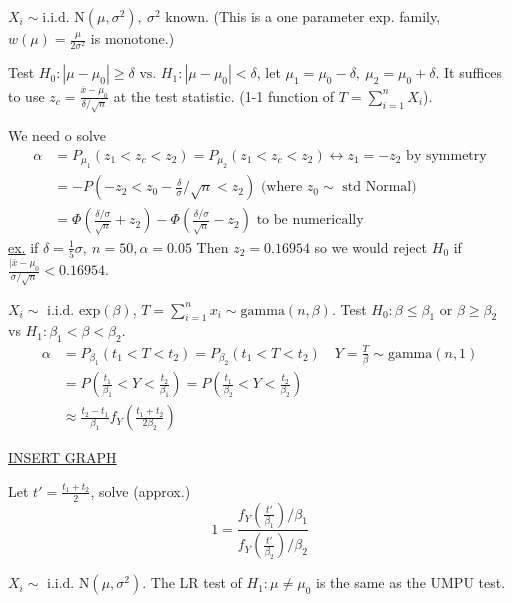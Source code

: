 \documentclass[english, 11pt]{article}
\newcommand{\lp}{\left(}
\newcommand{\rp}{\right)}
\begin{document}
\begin{exmp}
$X_i\sim\text{i.i.d. N}(\mu, \sigma^2), ~\sigma^2$ known. (This is a one parameter exp. family, $w(\mu)=\frac{\mu}{2\sigma^2}$ is monotone.)

Test $H_0:|\mu-\mu_0|\geq\delta\text{ vs. }H_1:|\mu-\mu_0|<\delta$, let $\mu_1=\mu_0-\delta, ~\mu_2=\mu_0+\delta$. It suffices to use $z_c=\frac{\bar{x}-\mu_0}{\delta/\sqrt{n}}$ at the test statistic. (1-1 function of $T=\sum_{i=1}^nX_i$).

We need o solve
$$
\begin{aligned}
\alpha&=P_{\mu_1}(z_1<z_c<z_2)=P_{\mu_2}(z_1<z_c<z_2)\leftrightarrow z_1=-z_2\text{ by symmetry}\\
&=-P\left(-z_2<z_0-\frac{\delta}{\sigma}\big/\sqrt{n}<z_2\right)\text{ (where $z_0\sim$ std Normal)}\\
&=\Phi\left(\frac{\delta/\sigma}{\sqrt{n}}+z_2\right)-\Phi\left(\frac{\delta/\sigma}{\sqrt{n}}-z_2\right)\text{ to be numerically}
\end{aligned}
$$
\underline{ex.} if $\delta=\frac{1}{5}\sigma,~n=50, \alpha=0.05$ Then $z_2=0.16954$ so we would reject $H_0$ if $\frac{|\bar{x}-\mu_0}{\sigma/\sqrt{n}}<0.16954$.
\end{exmp}


\begin{exmp}
$X_i\sim \text{ i.i.d. exp}(\beta)$, $T=\sum_{i=1}^nx_i\sim\text{gamma}(n, \beta)$. Test $H_0:\beta\leqslant\beta_1$ or $\beta\geqslant\beta_2$ vs $H_1: \beta_1<\beta<\beta_2$. 
$$
\begin{aligned}
\alpha&=P_{\beta_1}(t_1<T<t_2)=P_{\beta_2}(t_1<T<t_2)\quad Y=\frac{T}{\beta}\sim\text{gamma}(n, 1)\\
&=P\lp\frac{t_1}{\beta_1}<Y<\frac{t_2}{\beta_1}\rp=P\lp\frac{t_1}{\beta_2}<Y<\frac{t_2}{\beta_2}\rp\\
&\approx \frac{t_2-t_1}{\beta_1}f_Y\lp\frac{t_1+t_2}{2\beta_2}\rp
\end{aligned}
$$

{\Huge \underline{INSERT GRAPH}}

Let $t'=\frac{t_1+t_2}{2}$, solve (approx.)
$$
1=\frac{f_Y\lp\frac{t'}{\beta_1}\rp\big/\beta_1}{f_Y\lp\frac{t'}{\beta_2}\rp\big/\beta_2}
$$
\end{exmp}


\begin{exmp}
$X_i\sim \text{ i.i.d. N}(\mu, \sigma^2)$. The LR test of $H_1:\mu\not= \mu_0$ is the same as the UMPU test.
\end{exmp}
\end{document}
